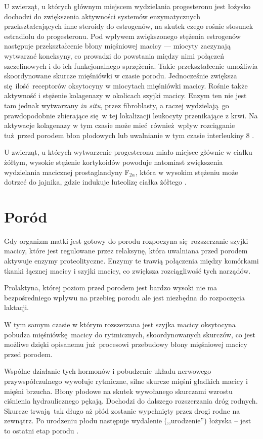 \documentclass[two column, twoside, a4paper]{article}
\begin{document}
U zwierząt, u których głównym miejscem wydzielania progesteronu jest łożysko dochodzi do zwiększenia aktywności systemów enzymatycznych przekształcających inne steroidy do estrogenów, na skutek czego rośnie stosunek estradiolu do progesteronu. Pod wpływem zwiększonego stężenia estrogenów następuje przekształcenie błony mięśniowej macicy --- miocyty zaczynają wytwarzać koneksyny, co prowadzi do powstania między nimi połączeń szczelinowych i do ich funkcjonalnego sprzężenia. Takie przekształcenie umożliwia skoordynowane skurcze mięśniówki w czasie porodu. Jednocześnie zwiększa się ilość receptorów oksytocyny w miocytach mięśniówki macicy. Rośnie także aktywność i stężenie kolagenazy w okolicach szyjki macicy. Enzym ten nie jest tam jednak wytwarzany \textit{in situ}, przez fibroblasty, a raczej wydzielają go prawdopodobnie zbierające się w tej lokalizacji leukocyty przenikające z krwi. Na aktywacje kolagenazy w tym czasie może mieć również wpływ rozciąganie tuż przed porodem błon płodowych lub uwalnianie w tym czasie interleukiny 8 \autocite{Krzymowski2005, Mitchell1993, Osmers1992, Rajabi1988, El1996}.

U zwierząt, u których wytwarzenie progesteronu miało miejsce głównie w ciałku żółtym, wysokie stężenie kortykoidów powoduje natomiast zwiększenia wydzielania macicznej prostaglandyny F$_{2\alpha}$, która w wysokim stężeniu może dotrzeć do jajnika, gdzie indukuje luteolizę ciałka żółtego \autocite{Krzymowski2005, Watanabe1994}.

\section{Poród}

Gdy organizm matki jest gotowy do porodu rozpoczyna się rozszerzanie szyjki macicy, które jest regulowane przez relaksynę, która uwalniana przed porodem aktywuje enzymy proteolityczne. Enzymy te trawią połączenia między komórkami tkanki łącznej macicy i szyjki macicy, co zwiększa rozciągliwość tych narządów.

Prolaktyna, której poziom przed porodem jest bardzo wysoki nie ma bezpośredniego wpływu na przebieg porodu ale jest niezbędna do rozpoczęcia laktacji.

W tym samym czasie w którym rozszerzana jest szyjka macicy oksytocyna pobudza mięśniówkę macicy do rytmicznych, skoordynowanych skurczów, co jest możliwe dzięki opisanemu już procesowi przebudowy błony mięśniowej macicy przed porodem.

Wspólne działanie tych hormonów i pobudzenie układu nerwowego przywspółczulnego wywołuje rytmiczne, silne skurcze mięśni gładkich macicy i mięśni brzucha. Błony płodowe na skutek wywołanego skurczami wzrostu ciśnienia hydraulicznego pękają. Dochodzi do dalszego rozszerzania dróg rodnych. Skurcze trwają tak długo aż płód zostanie wypchnięty przez drogi rodne na zewnątrz. Po urodzeniu płodu następuje wydalenie (,,urodzenie'') łożyska -- jest to ostatni etap porodu \autocite{Krzymowski2005}.
\end{document}
